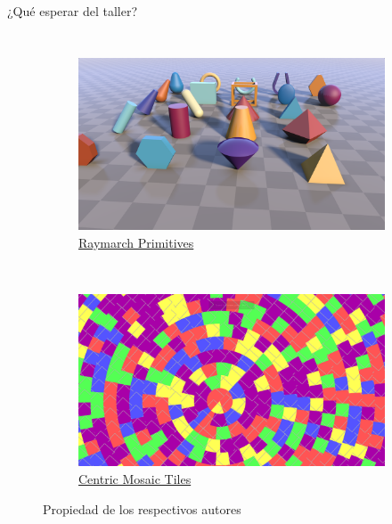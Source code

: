 \begin{frame}{¿Qué esperar del taller?}
\begin{columns}
\begin{figure}[htp]
\begin{subfigure}[b]{0.42\textwidth}
   \includegraphics[width=\textwidth]{img/Demo/Raymarching-Primitives}
   \caption{\href{https://www.shadertoy.com/view/Xds3zN}{Raymarch Primitives}}
 \end{subfigure}
~
 \begin{subfigure}[b]{0.42\textwidth}
   \includegraphics[width=\textwidth]{img/Demo/AnimatedCentricMosaicTiles}
   \caption{\href{https://www.shadertoy.com/view/43tfRr}{Centric Mosaic Tiles}}
 \end{subfigure}
 \caption{Propiedad de los respectivos autores}
\end{figure}
\end{columns}
\end{frame}

